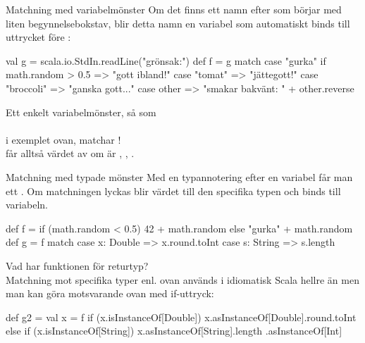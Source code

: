 \begin{Slide}{Matchning med variabelmönster}\SlideFontSmall
Om det finns ett namn efter  som börjar med liten begynnelsebokstav, blir detta namn en variabel som automatiskt binds till uttrycket före :

\begin{Code}
val g = scala.io.StdIn.readLine("grönsak:")
def f = g match {
  case "gurka" if math.random > 0.5 => "gott ibland!"
  case "tomat" => "jättegott!"
  case "broccoli" => "ganska gott..."
  case other => "smakar bakvänt: " + other.reverse
}
\end{Code}

Ett enkelt variabelmönster, så som \\  \\ i exemplet ovan, matchar ! \\ får alltså värdet av  om   är , , .  

\end{Slide}





\begin{Slide}{Matchning med typade mönster}\SlideFontSmall
Med en typannotering efter en variabel får man ett  . Om matchningen lyckas blir värdet  till den specifika typen och binds till variabeln.
\begin{Code}
def f = if (math.random < 0.5) 42 + math.random else "gurka" + math.random
def g = f match {
  case x: Double => x.round.toInt
  case s: String => s.length
}
\end{Code}
Vad har funktionen  för returtyp? \\ \pause
Matchning mot specifika typer enl. ovan används i idiomatisk Scala hellre än  men man kan göra motsvarande ovan med if-uttryck:
\begin{Code}
def g2 = {
  val x = f
  if (x.isInstanceOf[Double]) x.asInstanceOf[Double].round.toInt
  else if (x.isInstanceOf[String]) x.asInstanceOf[String].length
}.asInstanceOf[Int]
\end{Code}
\end{Slide}


